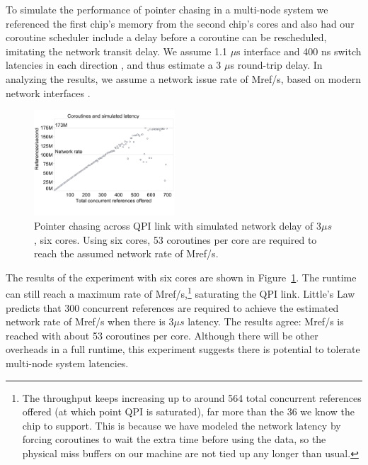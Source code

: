 \documentclass[10pt,nocopyrightspace]{sigplanconf}
\newcommand{\mrps}[1]{\unit[#1]{Mref/s}}
\begin{document}
To simulate the performance of pointer chasing in a multi-node system
we referenced the first chip's memory from the second chip's cores and also had our coroutine scheduler include a delay
before a coroutine can be rescheduled, imitating the network transit
delay. We assume 1.1 $\mu$s interface and 400 ns switch latencies in each direction
\cite{infiniband, mellanox:site}, and thus estimate a 3 $\mu$s round-trip
delay. In analyzing the results, we assume a network issue rate of \mrps{100}, based on modern network interfaces \cite{mellanox:press}.

\begin{figure}[t]
  \begin{center}
    \includegraphics[width=0.47\textwidth]{figures/delay7800-remote-edited.pdf}
  \end{center}
  \vspace{-0.3in}
  \caption{Pointer chasing across QPI link with simulated network delay of $3\mu s$, six cores. Using six cores, 53 coroutines per core are required to reach the assumed network rate of \mrps{100}.}
  \label{fig:network-delay}
\end{figure}

The results of the experiment with six cores are shown in
Figure~\ref{fig:network-delay}. The runtime can still reach a
maximum rate of \mrps{173},\footnote{The throughput keeps increasing
  up to around 564 total concurrent references offered (at which point
  QPI is saturated), far more than the 36 we know the chip to
  support. This is because we have modeled the network latency by
  forcing coroutines to wait the extra time before using the data, so
  the physical miss buffers on our machine are not tied up any longer
  than usual.} saturating the QPI link.  Little's Law predicts that 300 concurrent references are required to achieve the estimated network rate of \mrps{100} when there is $3\mu s$ latency. The results agree: \mrps{100} is reached with about 53 coroutines per core. Although there will be other overheads in a full runtime, this experiment suggests there is potential to tolerate multi-node system latencies.
\end{document}

